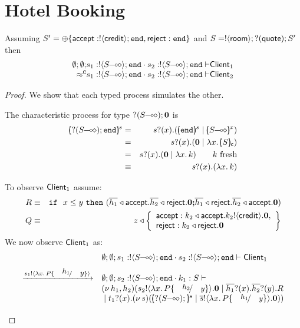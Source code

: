\section{Hotel Booking}
\label{hotel_closure}
\begin{proposition}
	Assuming $S' = \oplus \{\mathsf{accept}: ! \langle \mathsf{credit} \rangle ; \mathtt{end}, \mathsf{reject}: \mathtt{end}\}$ and
	$S = ! \langle \mathsf{room} \rangle ; ? (\mathsf{quote}) ; S'$
	then
\[
	\ahorel
	{\es}{s_1: \btout{\lhot{S}} \tinact \cat s_2: \btout{\lhot{S}} \tinact}{\Client_1}
	{\wbf}
	{s_1: \btout{\lhot{S}} \tinact \cat s_2: \btout{\lhot{S}} \tinact}{\Client_2}
\]
\end{proposition}

\begin{proof}
	We show that each typed process simulates the other.

	The characteristic process for type $? (S\!\! \multimap\!\! \diamond) ; \mathbf{0}$ is
	\begin{eqnarray*}
		\mapchar{\btinp{\lhot{S}} \tinact}{s} &=& \binp{s}{x} (\mapchar{\tinact}{s} \Par \mapchar{\lhot{S}}{x})\\
		&=& \binp{s}{x} (\inact \Par \abs{x}{\omapchar{S}})\\
		&=& \binp{s}{x} (\inact \Par \abs{x}{k}) \qquad k \textrm{ fresh}\\
		&\scong& \binp{s}{x} (\abs{x}{k})
	\end{eqnarray*}

	\noi To observe $\mathsf{Client}_1$ assume:
%
	\begin{eqnarray*}
	R &\equiv& \mathtt{if}\ \ x \leq y\ \mathtt{then}\  (\overline{h_1} \triangleleft \mathsf{accept} . \overline{h_2} \triangleleft \mathsf{reject} . \mathbf{0}
	\boldsymbol{;} \overline{h_1} \triangleleft \mathsf{reject} . \overline{h_2} \triangleleft \mathsf{accept} . \mathbf{0})\\
	Q &\equiv& z \triangleleft \left\{
		\begin{array}{l}
			\mathsf{accept}: k_2 \triangleleft \mathsf{accept} . k_2 ! \langle \mathsf{credit} \rangle . \mathbf{0},\\
			\mathsf{reject}: k_2 \triangleleft \mathsf{reject} . \mathbf{0}
		\end{array}
		\right\}
	\end{eqnarray*}
%
	\noi We now observe $\mathsf{Client}_1$ as:
\[
	\begin{array}{ll}
		& \es; \es; s_1: \btout{\lhot{S}} \tinact \cat s_2: \btout{\lhot{S}} \tinact \proves \Client_1
		\\[2mm]

		\by{\bactout{s_1}{\abs{x}{P \subst{h_1}{y}}}}&
		\es; \es; s_2: \btout{\lhot{S}} \tinact \cat k_1: S \proves \\
		& \newsp{h_1, h_2}{\bout{s_2}{\abs{x}{P \subst{h_2}{y}}} \inact
		\Par \binp{\dual{h_1}}{x} \binp{\dual{h_2}}{y} R\\
		& \Par \binp{t_1}{x} \newsp{s}{\mapchar{\btinp{\lhot{S}}}{s} \Par \bout{\dual{s}}{\abs{x}{P \subst{h_1}{y}}} \inact }}
		\\[2mm]


\end{array}\]
\end{proof}
